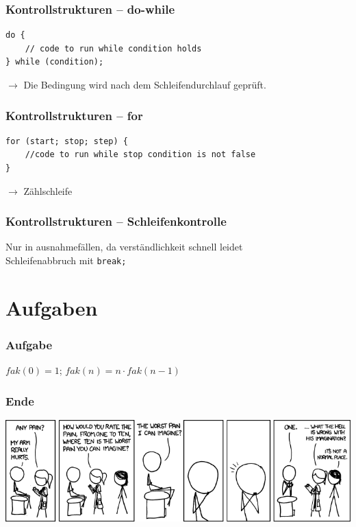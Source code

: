 \documentclass{beamer}
\begin{document}
\begin{frame}[fragile]
\frametitle{Kontrollstrukturen -- do-while}
\begin{verbatim}
do {
    // code to run while condition holds
} while (condition);
\end{verbatim}
$\rightarrow$ Die Bedingung wird nach dem Schleifendurchlauf gepr\"{u}ft.
\end{frame}

\begin{frame}[fragile]
\frametitle{Kontrollstrukturen -- for}
\begin{verbatim}
for (start; stop; step) {
    //code to run while stop condition is not false
}
\end{verbatim}
$\rightarrow$ Z\"{a}hlschleife
\end{frame}

\begin{frame}[fragile]
\frametitle{Kontrollstrukturen -- Schleifenkontrolle}
Nur in ausnahmef\"{a}llen, da verst\"{a}ndlichkeit schnell leidet\\
Schleifenabbruch mit \verb|break;|
\end{frame}


\section{Aufgaben}
\begin{frame}
\frametitle{Aufgabe}
$fak(0)=1$; $fak(n) = n\cdot{}fak(n-1)$
\end{frame}

\begin{frame}
\frametitle{Ende}
\includegraphics[scale=0.4]{pain_rating.png}
\end{frame}
\end{document}
